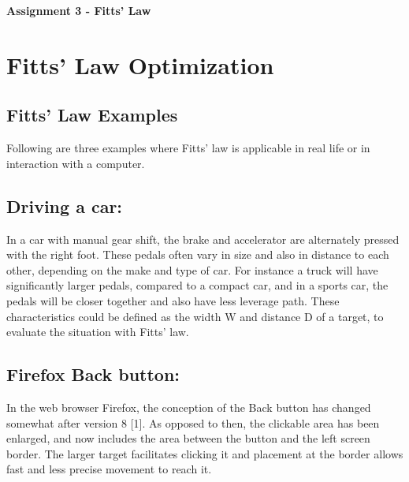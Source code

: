 \documentclass[a4paper,twoside,10pt]{article}
\begin{document}
\pagestyle{fancyplain}


\renewcommand{\headrulewidth}{0px}

\begin{center}
\huge{\textbf{Assignment 3 - Fitts' Law}}
\end{center}
\vspace{.5cm}

\section{Fitts' Law Optimization} 
\subsection{Fitts' Law Examples} 
Following are three examples where Fitts' law is applicable in real life or in interaction with a computer.
\subsection*{Driving a car:} In a car with manual gear shift, the brake and accelerator are alternately pressed with the right foot. These pedals often vary in size and also in distance to each other, depending on the make and type of car. For instance a truck will have significantly larger pedals, compared to a compact car, and in a sports car, the pedals will be closer together and also have less leverage path. These characteristics could be defined as the width W and distance D of a target, to evaluate the situation with Fitts' law.
\subsection*{Firefox Back button:} In the web browser Firefox, the conception of the Back button has changed somewhat after version 8 [1]. As opposed to then, the clickable area has been enlarged, and now includes the area between the button and the left screen border. The larger target facilitates clicking it and placement at the border allows fast and less precise movement to reach it.
\end{document}
